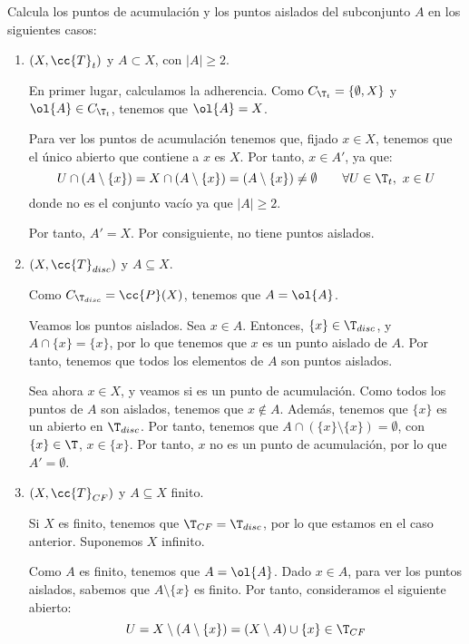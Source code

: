 \begin{ejercicio}
    Calcula los puntos de acumulación y los puntos aislados del subconjunto $A$ en los siguientes casos:
    \begin{enumerate}
        \item $(X,\cc{T}_t)$ y $A\subset X$, con $|A|\geq 2$.

        En primer lugar, calculamos la adherencia. Como $C_{\T_t}=\{\emptyset,X\}$ y $\ol{A}\in C_{\T_t}$, tenemos que $\ol{A}=X$.

        Para ver los puntos de acumulación tenemos que, fijado $x\in X$, tenemos que el único abierto que contiene a $x$ es $X$. Por tanto, $x\in A'$, ya que:
        \begin{equation*}
            U\cap (A\setminus \{x\})
            = X\cap (A\setminus \{x\})
            = (A\setminus \{x\})
            \neq \emptyset \qquad \forall U\in \T_t,~x\in U
        \end{equation*}
        donde no es el conjunto vacío ya que $|A|\geq 2$.

        Por tanto, $A'=X$. Por consiguiente, no tiene puntos aislados.
        
        \item $(X,\cc{T}_{disc})$ y $A\subseteq X$.

        Como $C_{\T_{disc}}=\cc{P}(X)$, tenemos que $A=\ol{A}$.

        Veamos los puntos aislados. Sea $x\in A$. Entonces, $\{x\}\in \T_{disc}$, y $A\cap \{x\}=\{x\}$, por lo que tenemos que $x$ es un punto aislado de $A$. Por tanto, tenemos que todos los elementos de $A$ son puntos aislados.
        
        Sea ahora $x\in X$, y veamos si es un punto de acumulación. Como todos los puntos de $A$ son aislados, tenemos que $x\notin A$. Además, tenemos que $\{x\}$ es un abierto en $\T_{disc}$. Por tanto, tenemos que $A\cap (\{x\}\setminus \{x\})=\emptyset$, con $\{x\}\in \T$, $x\in \{x\}$. Por tanto, $x$ no es un punto de acumulación, por lo que $A'=\emptyset$.
        
        \item $(X,\cc{T}_{CF})$ y $A\subseteq X$ finito.

        Si $X$ es finito, tenemos que $\T_{CF}=\T_{disc}$, por lo que estamos en el caso anterior. Suponemos $X$ infinito.
        
        Como $A$ es finito, tenemos que $A=\ol{A}$. Dado $x\in A$, para ver los puntos aislados, sabemos que $A\setminus \{x\}$ es finito. Por tanto, consideramos el siguiente abierto:
        \begin{equation*}
            U=X\setminus (A\setminus \{x\}) = (X\setminus A)\cup \{x\} \in \T_{CF}
        \end{equation*}


\end{enumerate}
\end{ejercicio}
